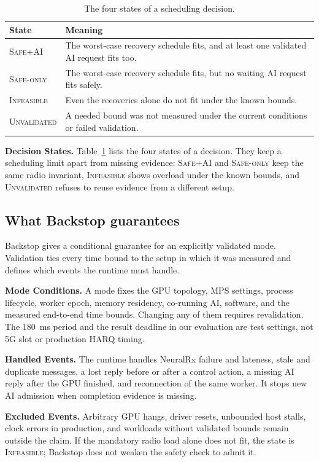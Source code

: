 \documentclass[acmsmall,screen,review,anonymous]{acmart}
\newcommand{\sys}{Backstop\xspace}
\newcommand{\QSU}{\textsc{Safe+AI}\xspace}
\newcommand{\QSN}{\textsc{Safe-only}\xspace}
\newcommand{\MI}{\textsc{Infeasible}\xspace}
\newcommand{\UQ}{\textsc{Unvalidated}\xspace}
\newcommand{\NRx}{NeuralRx\xspace}
\begin{document}
\begin{table}[t]
\caption{The four states of a scheduling decision.}
\label{tab:classes}
\begin{tabularx}{\linewidth}{@{}lX@{}}
\toprule
State & Meaning \\
\midrule
\QSU & The worst-case recovery schedule fits, and at least one validated AI request fits too. \\
\QSN & The worst-case recovery schedule fits, but no waiting AI request fits safely. \\
\MI  & Even the recoveries alone do not fit under the known bounds. \\
\UQ  & A needed bound was not measured under the current conditions or failed validation. \\
\bottomrule
\end{tabularx}
\end{table}

\noindent\textbf{Decision States.}
Table~\ref{tab:classes} lists the four states of a decision. They keep a scheduling limit apart from
missing evidence: \QSU and \QSN keep the same radio invariant, \MI shows overload under the known bounds,
and \UQ refuses to reuse evidence from a different setup.

\subsection{What \sys guarantees}
\label{sec:guarantee-scope}

\sys gives a conditional guarantee for an explicitly validated mode. Validation ties every time bound to
the setup in which it was measured and defines which events the runtime must handle.

\noindent\textbf{Mode Conditions.}
A mode fixes the GPU topology, MPS settings, process lifecycle, worker epoch, memory residency, co-running
AI, software, and the measured end-to-end time bounds. Changing any of them requires revalidation. The
180~ms period and the result deadline in our evaluation are test settings, not 5G slot or production
HARQ timing.

\noindent\textbf{Handled Events.}
The runtime handles \NRx failure and lateness, stale and duplicate messages, a lost reply before or after
a control action, a missing AI reply after the GPU finished, and reconnection of the same worker. It stops
new AI admission when completion evidence is missing.

\noindent\textbf{Excluded Events.}
Arbitrary GPU hangs, driver resets, unbounded host stalls, clock errors in production, and workloads
without validated bounds remain outside the claim. If the mandatory radio load alone does not fit, the
state is \MI; \sys does not weaken the safety check to admit it.
\end{document}
